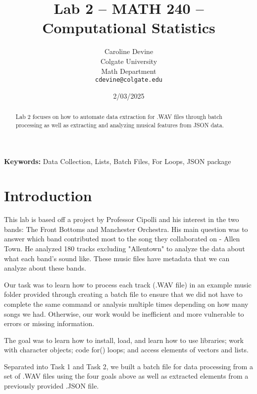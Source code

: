 \documentclass{article}\usepackage[]{graphicx}\usepackage[]{xcolor}
\begin{document}
\vspace{-1in}
\title{Lab 2 -- MATH 240 -- Computational Statistics}

\author{
  Caroline Devine \\
  Colgate University  \\
  Math Department  \\
  {\tt cdevine@colgate.edu}
}

\date{2/03/2025}

\maketitle

\begin{multicols}{2}
\begin{abstract}
Lab 2 focuses on how to automate data extraction for .WAV files through batch processing as well as extracting and analyzing musical features from JSON data. 
\end{abstract}

\noindent \textbf{Keywords:} Data Collection, Lists, Batch Files, For Loops, JSON package

\section{Introduction}
This lab is based off a project by Professor Cipolli and his interest in the two bands: The Front Bottoms and Manchester Orchestra. His main question was to answer which band contributed most to the song they collaborated on - Allen Town. He analyzed 180 tracks excluding "Allentown" to analyze the data about what each band's sound like. These music files have metadata that we can analyze about these bands.

Our task was to learn how to process each track (.WAV file) in an example music folder provided through creating a batch file to ensure that we did not have to complete the same command or analysis multiple times depending on how many songs we had. Otherwise, our work would be inefficient and more vulnerable to errors or missing information.

The goal was to learn how to install, load, and learn how to use libraries; work with character objects; code for() loops; and access elements of vectors and lists.

Separated into Task 1 and Task 2, we built a batch file for data processing from a set of .WAV files using the four goals above as well as extracted elements from a previously provided .JSON file. 


\end{multicols}
\end{document}

